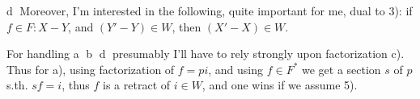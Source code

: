 \textcircled{d} Moreover, I'm interested in the following, quite important for me, dual to 3): if $f\in F:X-Y$, and $(Y'-Y)\in W$, then $(X'-X)\in W$.

For handling \textcircled{a} \textcircled{b} \textcircled{d} presumably I'll have to rely strongly upon factorization c). Thus for a), using factorization of $f=pi$, and using $f\in F^*$ we get a section $s$ of $p$  s.th. $sf=i$, thus $f$ is a retract of $i\in W$, and one wins if we assume 5).

